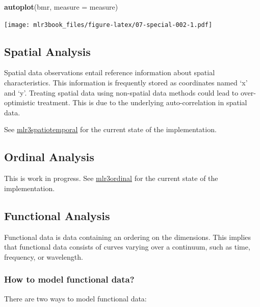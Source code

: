 \documentclass[]{article}
\newenvironment{Shaded}{\begin{snugshade}}{\end{snugshade}}
\newcommand{\DataTypeTok}[1]{\textcolor[rgb]{0.13,0.29,0.53}{#1}}
\newcommand{\KeywordTok}[1]{\textcolor[rgb]{0.13,0.29,0.53}{\textbf{#1}}}
\newcommand{\NormalTok}[1]{#1}
\renewenvironment{Shaded} {\begin{snugshade}\small} {\end{snugshade}}
\begin{document}
\begin{Shaded}
\begin{Highlighting}[]
\KeywordTok{autoplot}\NormalTok{(bmr, }\DataTypeTok{measure =}\NormalTok{ measure)}
\end{Highlighting}
\end{Shaded}

\texttt{[image: mlr3book\_files/figure-latex/07-special-002-1.pdf]}

\hypertarget{spatial}{%
\subsection{Spatial Analysis}\label{spatial}}

Spatial data observations entail reference information about spatial characteristics.
This information is frequently stored as coordinates named `x' and `y'.
Treating spatial data using non-spatial data methods could lead to over-optimistic treatment.
This is due to the underlying auto-correlation in spatial data.

See \href{https://github.com/mlr-org/mlr3spatiotemporal}{mlr3spatiotemporal} for the current state of the implementation.

\hypertarget{ordinal}{%
\subsection{Ordinal Analysis}\label{ordinal}}

This is work in progress.
See \href{https://github.com/mlr-org/mlr3ordinal}{mlr3ordinal} for the current state of the implementation.

\hypertarget{functional}{%
\subsection{Functional Analysis}\label{functional}}

Functional data is data containing an ordering on the dimensions.
This implies that functional data consists of curves varying over a continuum, such as time, frequency, or wavelength.

\hypertarget{how-to-model-functional-data}{%
\subsubsection{How to model functional data?}\label{how-to-model-functional-data}}

There are two ways to model functional data:
\end{document}
